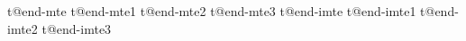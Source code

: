 %
%
%
%


\newif\if@ntromarker
\newif\if@ntro \newif\ift@tle \newif\ifb@dy \newif\ifNoBody
\newif\ifbeenb@dy
\newif\ifstartpara
\newif\ifintr@done\intr@donefalse %
\newif\ifReenterIntroOK\ReenterIntroOKtrue %
\newif\ifinextended \inextendedfalse %
\newcount\l@stparbadness
\newcount\p@rendnum %
\def\EndTitle#1{\x@\let\csname at@end-#1\endcsname\tr@e} %
\EndTitle{mte} \EndTitle{mte1} \EndTitle{mte2} \EndTitle{mte3}
\EndTitle{imte} \EndTitle{imte1} \EndTitle{imte2} \EndTitle{imte3}

\def\initp@rastyles{\@ntrofalse \t@tlefalse \b@dyfalse \def\m@rker{p}%
    \ifnum\BodyColumns=2 \hsize=\textwidth\else\onecolwidth{\hsize}\fi}

